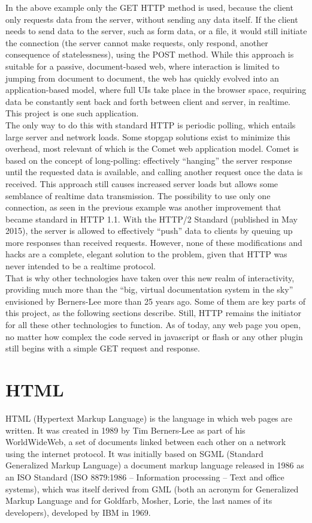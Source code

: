 In the above example only the GET HTTP method is used, because the client only requests data from the server, without sending any data itself. If the client needs to send data to the server, such as form data, or a file, it would still initiate the connection (the server cannot make requests, only respond, another consequence of statelessness), using the POST method. While this approach is suitable for a passive, document-based web, where interaction is limited to jumping from document to document, the web has quickly evolved into an application-based model, where full UIs take place in the browser space, requiring data be constantly sent back and forth between client and server, in realtime. This project is one such application.\\

The only way to do this with standard HTTP is periodic polling, which entails large server and network loads. Some stopgap solutions exist to minimize this overhead, most relevant of which is the Comet web application model. Comet is based on the concept of long-polling: effectively ``hanging'' the server response until the requested data is available, and calling another request once the data is received. This approach  still causes increased server loads but allows some semblance of realtime data transmission. The possibility to use only one connection, as seen in the previous example was another improvement that became standard in HTTP 1.1. With the HTTP/2 Standard (published in May 2015), the server is allowed to effectively ``push'' data to clients by queuing up more responses than received requests. However, none of these modifications and hacks are a complete, elegant solution to the problem, given that HTTP was never intended to be a realtime protocol.\\

That is why other technologies have taken over this new realm of interactivity, providing much more than the ``big, virtual documentation system in the sky'' \cite{bernerslee09} envisioned by Berners-Lee more than 25 years ago. Some of them are key parts of this project, as the following sections describe. Still, HTTP remains the initiator for all these other technologies to function. As of today, any web page you open, no matter how complex the code served in javascript or flash or any other plugin still begins with a simple GET request and response.
\section{HTML}
HTML (Hypertext Markup Language) is the language in which web pages are written. It was created in 1989 by Tim Berners-Lee as part of his WorldWideWeb, a set of documents linked between each other on a network using the internet protocol. It was initially based on SGML (Standard Generalized Markup Language) a document markup language released in 1986 as an ISO Standard (ISO 8879:1986 -- Information processing -- Text and office systems), which was itself derived from GML (both an acronym for Generalized Markup Language and for Goldfarb, Mosher, Lorie, the last names of its developers), developed by IBM in 1969.\\

